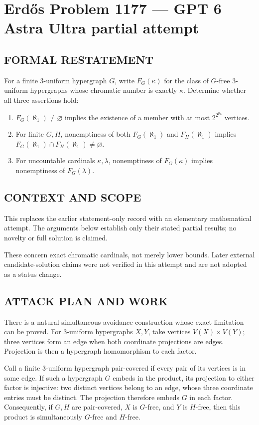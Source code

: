 \section*{Erd\H{o}s Problem 1177 --- GPT 6 Astra Ultra partial attempt}


\subsection*{FORMAL RESTATEMENT}
For a finite $3$-uniform hypergraph $G$, write $F_G(\kappa)$ for the class of $G$-free $3$-uniform hypergraphs whose chromatic number is exactly $\kappa$. Determine whether all three assertions hold:
\begin{enumerate}
\item $F_G(\aleph_1)\ne\varnothing$ implies the existence of a member with at most $2^{2^{\aleph_0}}$ vertices.
\item For finite $G,H$, nonemptiness of both $F_G(\aleph_1)$ and $F_H(\aleph_1)$ implies $F_G(\aleph_1)\cap F_H(\aleph_1)\ne\varnothing$.
\item For uncountable cardinals $\kappa,\lambda$, nonemptiness of $F_G(\kappa)$ implies nonemptiness of $F_G(\lambda)$.
\end{enumerate}

\subsection*{CONTEXT AND SCOPE}
This replaces the earlier statement-only record with an elementary mathematical attempt. The arguments below establish only their stated partial results; no novelty or full solution is claimed.

These concern exact chromatic cardinals, not merely lower bounds. Later external candidate-solution claims were not verified in this attempt and are not adopted as a status change.

\subsection*{ATTACK PLAN AND WORK}
There is a natural simultaneous-avoidance construction whose exact limitation
can be proved. For 3-uniform hypergraphs $X,Y$, take vertices $V(X)\times V(Y)$;
three vertices form an edge when both coordinate projections are edges.
Projection is then a hypergraph homomorphism to each factor.

Call a finite 3-uniform hypergraph pair-covered if every pair of its vertices
is in some edge. If such a hypergraph $G$ embeds in the product, its projection
to either factor is injective: two distinct vertices belong to an edge, whose
three coordinate entries must be distinct. The projection therefore embeds
$G$ in each factor. Consequently, if $G,H$ are pair-covered, $X$ is $G$-free,
and $Y$ is $H$-free, then this product is simultaneously $G$-free and $H$-free.

